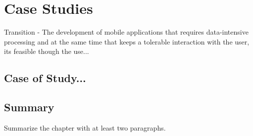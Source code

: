 
\chapter{Case Studies} %


Transition - The development of mobile applications that requires data-intensive processing and at the same time that keeps a tolerable interaction with the user, its feasible though the use...



\ifpdf
    \graphicspath{{X/figures/PNG/}{X/figures/PDF/}{X/figures/}}
\else
    \graphicspath{{X/figures/EPS/}{X/figures/}}
\fi


%	
%

\section{Case of Study...}



\section{Summary}
Summarize the chapter with at least two paragraphs.




